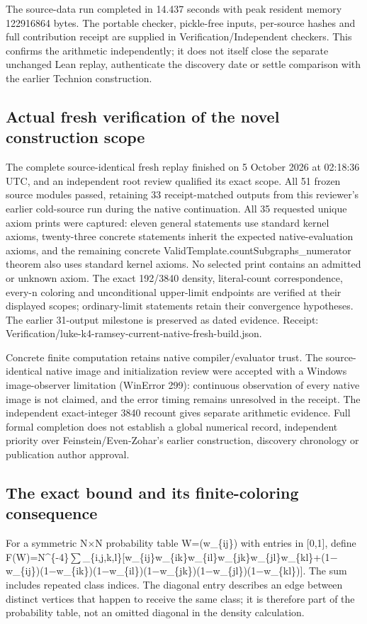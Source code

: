 \documentclass[11pt,a4paper]{article}
\begin{document}
The source-data run completed in 14.437 seconds with peak resident memory 122916864 bytes. The portable checker, pickle-free inputs, per-source hashes and full contribution receipt are supplied in Verification/Independent checkers. This confirms the arithmetic independently; it does not itself close the separate unchanged Lean replay, authenticate the discovery date or settle comparison with the earlier Technion construction.

\subsection{Actual fresh verification of the novel construction scope}
The complete source-identical fresh replay finished on 5 October 2026 at 02:18:36 UTC, and an independent root review qualified its exact scope. All 51 frozen source modules passed, retaining 33 receipt-matched outputs from this reviewer's earlier cold-source run during the native continuation. All 35 requested unique axiom prints were captured: eleven general statements use standard kernel axioms, twenty-three concrete statements inherit the expected native-evaluation axioms, and the remaining concrete ValidTemplate.countSubgraphs\_numerator theorem also uses standard kernel axioms. No selected print contains an admitted or unknown axiom. The exact 192/3840 density, literal-count correspondence, every-n coloring and unconditional upper-limit endpoints are verified at their displayed scopes; ordinary-limit statements retain their convergence hypotheses. The earlier 31-output milestone is preserved as dated evidence. Receipt: Verification/luke-k4-ramsey-current-native-fresh-build.json.

Concrete finite computation retains native compiler/evaluator trust. The source-identical native image and initialization review were accepted with a Windows image-observer limitation (WinError 299): continuous observation of every native image is not claimed, and the error timing remains unresolved in the receipt. The independent exact-integer 3840 recount gives separate arithmetic evidence. Full formal completion does not establish a global numerical record, independent priority over Feinstein/Even-Zohar's earlier construction, discovery chronology or publication author approval.

\subsection{The exact bound and its finite-coloring consequence}
For a symmetric N\ensuremath{\times}N probability table W=(w\_\{ij\}) with entries in [0,1], define F(W)=N\textasciicircum{}\{-4\}\ensuremath{\sum}\_\{i,j,k,l\}[w\_\{ij\}w\_\{ik\}w\_\{il\}w\_\{jk\}w\_\{jl\}w\_\{kl\}+(1\ensuremath{-}w\_\{ij\})(1\ensuremath{-}w\_\{ik\})(1\ensuremath{-}w\_\{il\})(1\ensuremath{-}w\_\{jk\})(1\ensuremath{-}w\_\{jl\})(1\ensuremath{-}w\_\{kl\})]. The sum includes repeated class indices. The diagonal entry describes an edge between distinct vertices that happen to receive the same class; it is therefore part of the probability table, not an omitted diagonal in the density calculation.
\end{document}
